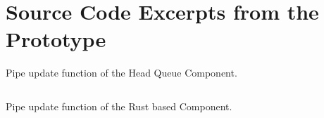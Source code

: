 \vfill

\section{Source Code Excerpts from the Prototype}%
\label{appendix:code}

\begin{center}
	\begin{minipage}{0.95\textwidth}
		\begin{listing}[H]
			\captionsetup{margin=0pt}
			\caption{Pipe update function of the Head Queue Component.}
			\label{lst:eval:hqC}
			\inputminted[fontsize=\scriptsize]{C}{listings/head_queue.c}
		\end{listing}
		\begin{listing}[H]
			\captionsetup{margin=0pt}
			\caption{Pipe update function of the Rust based Component.}
			\label{lst:eval:hqRust}
			\inputminted[fontsize=\scriptsize]{Rust}{listings/mod.rs}
		\end{listing}
	\end{minipage}
\end{center}
